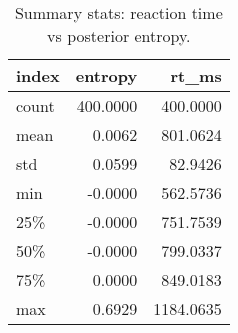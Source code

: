 \begin{table}[!ht]
\centering
\begin{table}
\caption{Summary stats: reaction time vs posterior entropy.}
\label{tab:fig12}
\begin{tabular}{lrr}
\toprule
index & entropy & rt\_ms \\
\midrule
count & 400.0000 & 400.0000 \\
mean & 0.0062 & 801.0624 \\
std & 0.0599 & 82.9426 \\
min & -0.0000 & 562.5736 \\
25\% & -0.0000 & 751.7539 \\
50\% & -0.0000 & 799.0337 \\
75\% & 0.0000 & 849.0183 \\
max & 0.6929 & 1184.0635 \\
\bottomrule
\end{tabular}
\end{table}
\end{table}
